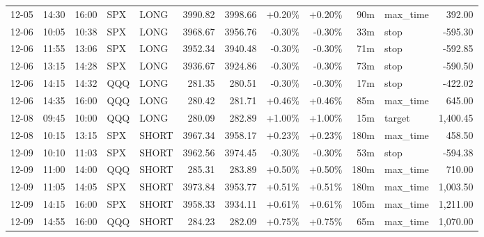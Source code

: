 \documentclass[11pt,a4paper]{article}
\begin{document}
\begin{center}
\begin{longtable}{>{\color{txtmain}}l l l l l r r r r r >{\color{txtmain}}l r}
12-05 & 14:30 & 16:00 & SPX & LONG & 3990.82 & 3998.66 & \textcolor{wingreen}{+0.20\%} & \textcolor{wingreen}{+0.20\%} & 90m & max\_time & \textcolor{wingreen}{392.00} \\
12-06 & 10:05 & 10:38 & SPX & LONG & 3968.67 & 3956.76 & \textcolor{lossred}{-0.30\%} & \textcolor{lossred}{-0.30\%} & 33m & stop & \textcolor{lossred}{-595.30} \\
12-06 & 11:55 & 13:06 & SPX & LONG & 3952.34 & 3940.48 & \textcolor{lossred}{-0.30\%} & \textcolor{lossred}{-0.30\%} & 71m & stop & \textcolor{lossred}{-592.85} \\
12-06 & 13:15 & 14:28 & SPX & LONG & 3936.67 & 3924.86 & \textcolor{lossred}{-0.30\%} & \textcolor{lossred}{-0.30\%} & 73m & stop & \textcolor{lossred}{-590.50} \\
12-06 & 14:15 & 14:32 & QQQ & LONG & 281.35 & 280.51 & \textcolor{lossred}{-0.30\%} & \textcolor{lossred}{-0.30\%} & 17m & stop & \textcolor{lossred}{-422.02} \\
12-06 & 14:35 & 16:00 & QQQ & LONG & 280.42 & 281.71 & \textcolor{wingreen}{+0.46\%} & \textcolor{wingreen}{+0.46\%} & 85m & max\_time & \textcolor{wingreen}{645.00} \\
12-08 & 09:45 & 10:00 & QQQ & LONG & 280.09 & 282.89 & \textcolor{wingreen}{+1.00\%} & \textcolor{wingreen}{+1.00\%} & 15m & target & \textcolor{wingreen}{1,400.45} \\
12-08 & 10:15 & 13:15 & SPX & SHORT & 3967.34 & 3958.17 & \textcolor{wingreen}{+0.23\%} & \textcolor{wingreen}{+0.23\%} & 180m & max\_time & \textcolor{wingreen}{458.50} \\
12-09 & 10:10 & 11:03 & SPX & SHORT & 3962.56 & 3974.45 & \textcolor{lossred}{-0.30\%} & \textcolor{lossred}{-0.30\%} & 53m & stop & \textcolor{lossred}{-594.38} \\
12-09 & 11:00 & 14:00 & QQQ & SHORT & 285.31 & 283.89 & \textcolor{wingreen}{+0.50\%} & \textcolor{wingreen}{+0.50\%} & 180m & max\_time & \textcolor{wingreen}{710.00} \\
12-09 & 11:05 & 14:05 & SPX & SHORT & 3973.84 & 3953.77 & \textcolor{wingreen}{+0.51\%} & \textcolor{wingreen}{+0.51\%} & 180m & max\_time & \textcolor{wingreen}{1,003.50} \\
12-09 & 14:15 & 16:00 & SPX & SHORT & 3958.33 & 3934.11 & \textcolor{wingreen}{+0.61\%} & \textcolor{wingreen}{+0.61\%} & 105m & max\_time & \textcolor{wingreen}{1,211.00} \\
12-09 & 14:55 & 16:00 & QQQ & SHORT & 284.23 & 282.09 & \textcolor{wingreen}{+0.75\%} & \textcolor{wingreen}{+0.75\%} & 65m & max\_time & \textcolor{wingreen}{1,070.00} \\

\end{longtable}
\end{center}
\end{document}
